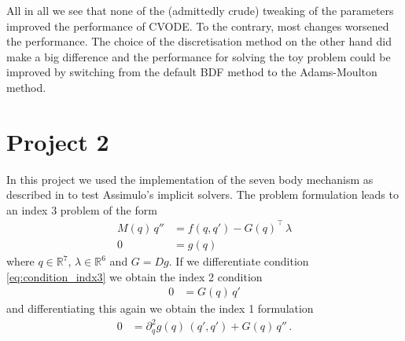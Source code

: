 \documentclass{report}
\def\R{\mathbb{R}}
\begin{document}
\newpage
All in all we see that none of the (admittedly crude) tweaking of the parameters improved the performance of CVODE. To the contrary, most changes worsened the performance. The choice of the discretisation method on the other hand did make a big difference and the performance for solving the toy problem could be improved by switching from the default BDF method to the Adams-Moulton method.


\chapter*{Project 2}

In this project we used the implementation of the seven body mechanism as described in \cite{HW_SolvingODEs} to test Assimulo's implicit solvers. The problem formulation leads to an index 3 problem of the form
\begin{align}
	M(q)\,q''&= f(q,q')-G(q)^\top\,\lambda\label{eq:sevenBody} \\
	0 &= g(q) \label{eq:condition_indx3}
\end{align}
where $q\in\R^7$, $\lambda\in\R^6$ and $G=Dg$. If we differentiate condition \eqref{eq:condition_indx3} we obtain the index 2 condition
\begin{align*}
	0&=G(q)\,q'
\end{align*}
and differentiating this again we obtain the index 1 formulation
\begin{align}
	0&= \partial_q^2g(q)\,(q',q')+G(q)\,q''\,.  \label{eq:condition_indx1}
\end{align}
\end{document}
